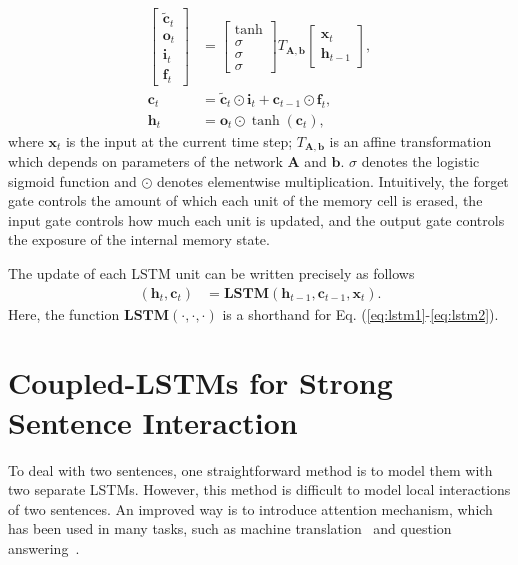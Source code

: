 \documentclass{article}
\def\h{\mathbf{h}}
\def\bx{\mathbf{x}}
\def\cc{\mathbf{c}}
\def\cc{\mathbf{c}}
\begin{document}
\begin{align}
	\begin{bmatrix}
		\mathbf{\tilde{c}}_{t} \\
		\mathbf{o}_{t} \\
		\mathbf{i}_{t} \\
		\mathbf{f}_{t}
	\end{bmatrix}
	&=
	\begin{bmatrix}
		\tanh \\
		\sigma \\
		\sigma \\
		\sigma
	\end{bmatrix}
	T_{\mathbf{A},\mathbf{b}}
	\begin{bmatrix}
		\mathbf{x}_{t} \\
		\mathbf{h}_{t-1}
	\end{bmatrix},\label{eq:lstm1}\\
\mathbf{c}_{t} &=
		\mathbf{\tilde{c}}_{t} \odot \mathbf{i}_{t}
		+ \mathbf{c}_{t-1} \odot \mathbf{f}_{t}, \\
	\mathbf{h}_{t} &= \mathbf{o}_{t}  \odot \tanh\left( \mathbf{c}_{t}  \right)\label{eq:lstm2},
\end{align}
where $\bx_t$ is the input at the current time step;
$T_{\mathbf{A},\mathbf{b}}$ is an affine transformation which depends on parameters of the network $\mathbf{A}$ and $\mathbf{b}$.
$\sigma$ denotes the logistic sigmoid function and $\odot$ denotes elementwise multiplication. Intuitively, the forget gate controls the amount of which each unit of the memory cell is erased, the input gate controls how much each unit is updated, and the output gate controls the exposure of the internal memory state.

The update of each LSTM unit can be written precisely as follows
\begin{align}
(\h_t,\cc_t) &= \mathbf{LSTM}(\h_{t-1},\cc_{t-1},\mathbf{x}_t).
\end{align}
Here, the function $\mathbf{LSTM}(\cdot, \cdot, \cdot)$ is a shorthand for Eq. (\ref{eq:lstm1}-\ref{eq:lstm2}).

\section{Coupled-LSTMs for Strong Sentence Interaction}

To deal with two sentences, one straightforward method is to model them with two separate LSTMs. However, this method is difficult to model local interactions of two sentences. An improved way is to introduce attention mechanism, which has been used in many tasks, such as machine translation~\cite{bahdanau2014neural} and question answering~\cite{hermann2015teaching}.
\end{document}
